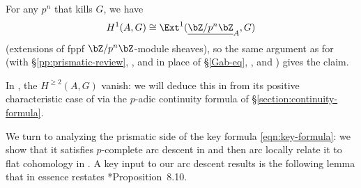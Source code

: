 \bpf
For any $p^n$ that kills $G$, we have
\[
H^1(A, G) \cong \Ext^1(\underline{\bZ/p^n\bZ}_A, G)
\]
(extensions of fppf $\bZ/p^n\bZ$-module sheaves), so the same argument as for  (with \S\ref{pp:prismatic-review}, , and  in place of \S\ref{Gab-eq}, , and ) gives the claim.
\epf






\brem
In , the $H^{\ge 2}(A, G)$ vanish: we will deduce this in  from its positive characteristic case of  via the $p$-adic continuity formula of \S\ref{section:continuity-formula}.
\erem




We turn to analyzing the prismatic side of the key formula \eqref{eqn:key-formula}: we show that it satisfies $p$-complete arc descent in  and then arc locally relate it to flat cohomology in . A key input to our %
arc descent results is the following lemma that in essence restates \cite{BS19}*{Proposition~8.10}.

